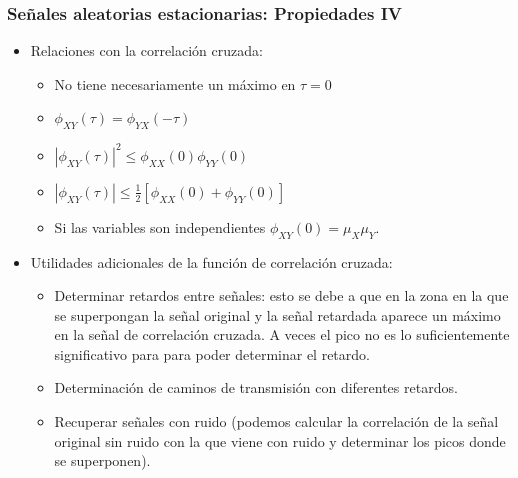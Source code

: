 
\begin{frame}
\frametitle{Señales aleatorias estacionarias: Propiedades IV}


\footnotesize
\begin{itemize}

\item Relaciones con la correlación cruzada:


\begin{itemize}

\footnotesize

\item No tiene necesariamente un máximo en $\tau=0$

\vspace{0.1cm}

\item $\phi_{XY}(\tau)=\phi_{YX}(-\tau)$

\vspace{0.1cm}

\item  $|\phi_{XY}(\tau)|^2 \le \phi_{XX}(0) \phi_{YY}(0)$

\vspace{0.1cm}

\item  $|\phi_{XY}(\tau)| \le \frac{1}{2} [\phi_{XX}(0) +\phi_{YY}(0)]$

\vspace{0.1cm}

\item  Si las variables son independientes $\phi_{XY}(0)=\mu_X \mu_Y$.

\end{itemize}


\item Utilidades adicionales de la función de correlación cruzada:

\begin{itemize}

\footnotesize

\item Determinar retardos entre señales: esto se debe a que en la zona en la que se superpongan la señal original y la señal retardada aparece un máximo en la señal de correlación cruzada. A veces el pico no es lo suficientemente significativo para para poder determinar el retardo.

\item Determinación de caminos de transmisión con diferentes retardos.

\item Recuperar señales con ruido (podemos calcular la correlación de la señal original sin ruido con la que viene con ruido y determinar los picos donde se superponen).

\end{itemize}

\end{itemize}
\end{frame}

